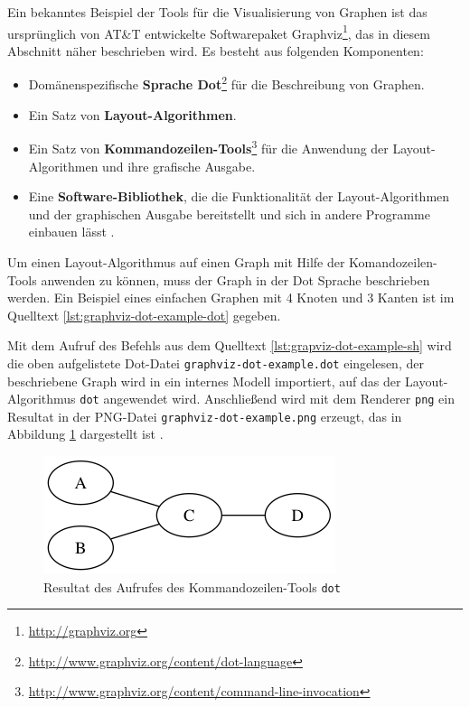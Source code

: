 Ein bekanntes Beispiel der Tools für die Visualisierung von Graphen ist das ursprünglich von AT\&T entwickelte Softwarepaket Graphviz\footnote{\url{http://graphviz.org}}, das in diesem Abschnitt näher beschrieben wird. Es besteht aus folgenden Komponenten:

\begin{itemize}
    \item Domänenspezifische \textbf{Sprache Dot}\footnote{\url{http://www.graphviz.org/content/dot-language}} für die Beschreibung von Graphen.
    \item Ein Satz von \textbf{Layout-Algorithmen}.
    \item Ein Satz von \textbf{Kommandozeilen-Tools}\footnote{\url{http://www.graphviz.org/content/command-line-invocation}} für die Anwendung der Layout-Algorithmen und ihre grafische Ausgabe.
    \item Eine \textbf{Software-Bibliothek}, die die Funktionalität der Layout-Algorithmen und der graphischen Ausgabe bereitstellt und sich in andere Programme einbauen lässt \cite{Gansner14Using}.
\end{itemize}

Um einen Layout-Algorithmus auf einen Graph mit Hilfe der Komandozeilen-Tools anwenden zu können, muss der Graph in der Dot Sprache beschrieben werden. Ein Beispiel eines einfachen Graphen mit 4 Knoten und 3 Kanten ist im Quelltext \ref{lst:graphviz-dot-example-dot} gegeben.



Mit dem Aufruf des Befehls aus dem Quelltext \ref{lst:grapviz-dot-example-sh} wird die oben aufgelistete Dot-Datei \lstinline{graphviz-dot-example.dot} eingelesen, der beschriebene Graph wird in ein internes Modell importiert, auf das der Layout-Algorithmus \lstinline{dot} angewendet wird. Anschließend wird mit dem Renderer \lstinline{png} ein Resultat in der PNG-Datei \lstinline{graphviz-dot-example.png} erzeugt, das in Abbildung \ref{fig:graphviz-dot-example} dargestellt ist \cite{Gansner14Using}.



\begin{figure}[hbt]
    \centering
    \includegraphics[scale=0.8]{resources/graphviz-dot-example.png}
    \caption{Resultat des Aufrufes des Kommandozeilen-Tools \lstinline{dot}}
    \label{fig:graphviz-dot-example}
\end{figure}


